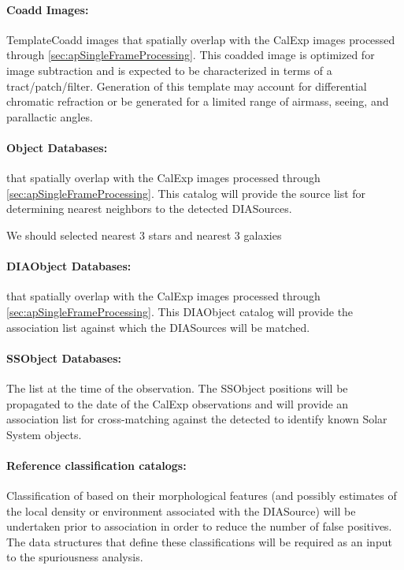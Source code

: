 \paragraph*{Coadd Images:} TemplateCoadd images that spatially overlap with the CalExp images processed through \ref{sec:apSingleFrameProcessing}. This coadded image is optimized for image subtraction and is expected to be characterized in terms of a tract/patch/filter. Generation of this template may account for differential chromatic refraction or be generated for a limited range of airmass, seeing, and parallactic angles.

\paragraph*{Object Databases:} \Objects that spatially overlap with the CalExp images processed through \ref{sec:apSingleFrameProcessing}. This \Object catalog will provide the source list for determining nearest neighbors to the detected DIASources. 

\begin{note} We should selected nearest 3 stars and nearest 3 galaxies \end{note}

\paragraph*{DIAObject Databases:} \DIAObjects that spatially overlap with the CalExp images processed through \ref{sec:apSingleFrameProcessing}. This DIAObject catalog will provide the association  list against which the DIASources will be matched. 

\paragraph*{SSObject Databases:} The \SSObject list at the time of the observation. The SSObject positions will be propagated to the date of the CalExp observations and will provide an association  list for cross-matching against the detected \DIASources to identify known Solar System objects.

\paragraph*{Reference classification catalogs:} Classification of \DIASources based on their morphological features (and possibly estimates of the local density or  environment associated with the DIASource) will be undertaken prior to association in order to reduce the number of false positives. The data structures that define these classifications will be required as an input to the spuriousness analysis. 



